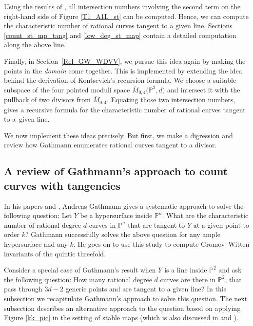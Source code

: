 \documentclass[pdftex]{sigma}
\numberwithin{equation}{section}
\begin{document}
Using the results of \cite{AiM_m_fold_pt},
all intersection numbers involving the second term on the right-hand side of Figure \ref{T1_A1L_st} can be computed.
Hence, we can compute the characteristic number of rational curves tangent to a given line.
Sections \ref{count_st_mp_tang} and \ref{low_deg_st_map} contain a detailed computation along the above line.

Finally, in Section~\ref{Rel_GW_WDVV}, we pursue this idea again by making the points in the
\textit{domain} come together.
This is implemented by extending the idea behind the derivation of Kontsevich's recursion formula.
We choose a suitable subspace of the four pointed moduli space $\overline{M}_{0,4}\bigl(\mathbb{P}^2, d\bigr)$
and intersect it with the pullback of two divisors from $\overline{M}_{0,4}$.
Equating those two intersection numbers, gives a recursive formula for the characteristic number
of rational curves tangent to a~given line.

We now implement these ideas precisely. But first, we make a digression and review how Gathmann
enumerates rational curves tangent to a divisor.


\subsection{A review of Gathmann's approach to count curves with tangencies}
\label{Gathman_generalize}

In his papers \cite{AnGaPhD,AnGa1} and \cite{AnGa2}, Andreas Gathmann gives a systematic approach to solve the following question:
Let $Y$ be a hypersurface inside $\mathbb{P}^n$. What are the characteristic number of rational degree $d$ curves in
$\mathbb{P}^n$ that are tangent to $Y$ at a given point to order $k$? Gathmann successfully solves the above question
for any ample hypersurface and any $k$. He goes on to use this study to compute Gromov--Witten invariants of the quintic threefold.

Consider a special case of Gathmann's result when $Y$ is a line inside $\mathbb{P}^2$ and
ask the following question: How many rational degree $d$ curves are there in $\mathbb{P}^2$, that pass through $3d-2$
generic points and are tangent to a given line?
In this subsection we recapitulate Gathmann's approach to solve this question.
The next subsection describes an alternative approach to the question
based on applying Figure \ref{kk_pic} in the setting of stable maps
(which is also discussed in \cite[pp.~41]{Gath_blow_up} and \cite[pp.~1179--1180]{MK_published}).
\end{document}

